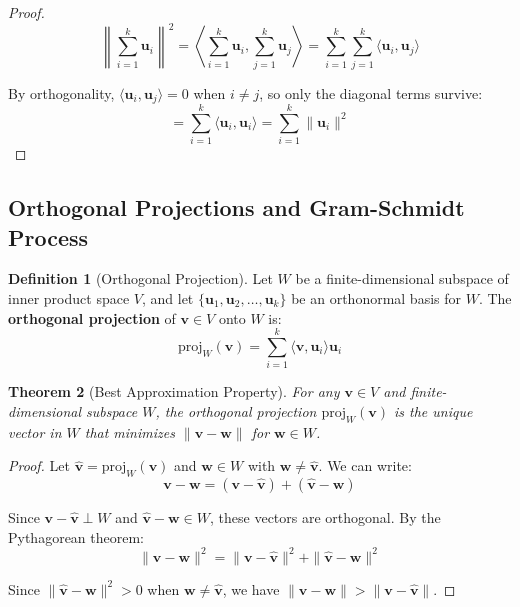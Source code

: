 \documentclass[12pt]{article}
\numberwithin{equation}{section}
\newcommand{\vect}[1]{\boldsymbol{#1}}   %
\theoremstyle{plain}
\newtheorem{theorem}{Theorem}[section]
\theoremstyle{definition}
\newtheorem{definition}[theorem]{Definition}
\theoremstyle{remark}
\begin{document}
\begin{proof}
$$\left\|\sum_{i=1}^k \vect{u}_i\right\|^2 = \left\langle \sum_{i=1}^k \vect{u}_i, \sum_{j=1}^k \vect{u}_j \right\rangle = \sum_{i=1}^k \sum_{j=1}^k \langle \vect{u}_i, \vect{u}_j \rangle$$

By orthogonality, $\langle \vect{u}_i, \vect{u}_j \rangle = 0$ when $i \neq j$, so only the diagonal terms survive:
$$= \sum_{i=1}^k \langle \vect{u}_i, \vect{u}_i \rangle = \sum_{i=1}^k \|\vect{u}_i\|^2$$
\end{proof}

\subsection{Orthogonal Projections and Gram-Schmidt Process}

\begin{definition}[Orthogonal Projection]
Let $W$ be a finite-dimensional subspace of inner product space $V$, and let $\{\vect{u}_1, \vect{u}_2, \ldots, \vect{u}_k\}$ be an orthonormal basis for $W$. The \textbf{orthogonal projection} of $\vect{v} \in V$ onto $W$ is:
$$\text{proj}_W(\vect{v}) = \sum_{i=1}^k \langle \vect{v}, \vect{u}_i \rangle \vect{u}_i$$
\end{definition}

\begin{theorem}[Best Approximation Property]
For any $\vect{v} \in V$ and finite-dimensional subspace $W$, the orthogonal projection $\text{proj}_W(\vect{v})$ is the unique vector in $W$ that minimizes $\|\vect{v} - \vect{w}\|$ for $\vect{w} \in W$.
\end{theorem}

\begin{proof}
Let $\hat{\vect{v}} = \text{proj}_W(\vect{v})$ and $\vect{w} \in W$ with $\vect{w} \neq \hat{\vect{v}}$. We can write:
$$\vect{v} - \vect{w} = (\vect{v} - \hat{\vect{v}}) + (\hat{\vect{v}} - \vect{w})$$

Since $\vect{v} - \hat{\vect{v}} \perp W$ and $\hat{\vect{v}} - \vect{w} \in W$, these vectors are orthogonal. By the Pythagorean theorem:
$$\|\vect{v} - \vect{w}\|^2 = \|\vect{v} - \hat{\vect{v}}\|^2 + \|\hat{\vect{v}} - \vect{w}\|^2$$

Since $\|\hat{\vect{v}} - \vect{w}\|^2 > 0$ when $\vect{w} \neq \hat{\vect{v}}$, we have $\|\vect{v} - \vect{w}\| > \|\vect{v} - \hat{\vect{v}}\|$.
\end{proof}
\end{document}
